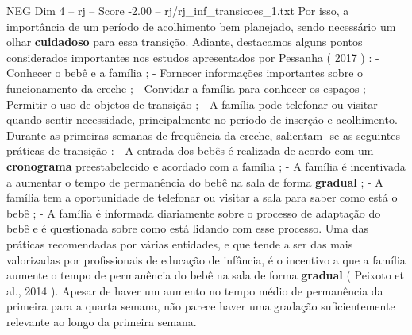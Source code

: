 \begin{textsample}{NEG Dim 4 – rj – Score -2.00 – rj/rj\_inf\_transicoes\_1.txt}
Por isso, a importância de um período de acolhimento bem planejado, sendo necessário um olhar \textbf{cuidadoso} para essa transição.
Adiante, destacamos alguns pontos considerados importantes nos estudos apresentados por Pessanha ( 2017 ) : - Conhecer o bebê e a família ; - Fornecer informações importantes sobre o funcionamento da creche ; - Convidar a família para conhecer os espaços ; - Permitir o uso de objetos de transição ; - A família pode telefonar ou visitar quando sentir necessidade, principalmente no período de inserção e acolhimento.
Durante as primeiras semanas de frequência da creche, salientam -se as seguintes práticas de transição : - A entrada dos bebês é realizada de acordo com um \textbf{cronograma} preestabelecido e acordado com a família ; - A família é incentivada a aumentar o tempo de permanência do bebê na sala de forma \textbf{gradual} ; - A família tem a oportunidade de telefonar ou visitar a sala para saber como está o bebê ; - A família é informada diariamente sobre o processo de adaptação do bebê e é questionada sobre como está lidando com esse processo.
Uma das práticas recomendadas por várias entidades, e que tende a ser das mais valorizadas por profissionais de educação de infância, é o incentivo a que a família aumente o tempo de permanência do bebê na sala de forma \textbf{gradual} ( Peixoto et al., 2014 ).
Apesar de haver um aumento no tempo médio de permanência da primeira para a quarta semana, não parece haver uma gradação suficientemente relevante ao longo da primeira semana.

\end{textsample}
